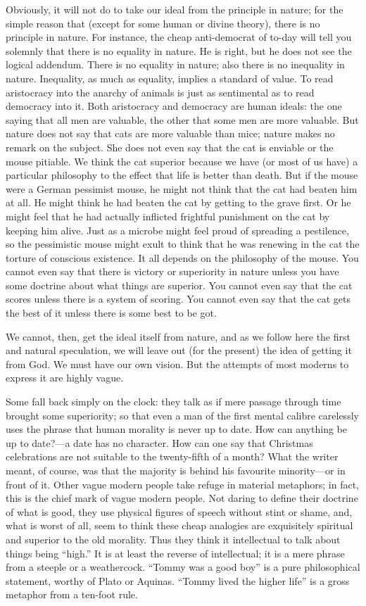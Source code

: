 Obviously, it will not do to take our ideal from the principle in nature; for the simple reason that (except for some human or divine theory), there is no principle in nature. For instance, the cheap anti-democrat of to-day will tell you solemnly that there is no equality in nature. He is right, but he does not see the logical addendum. There is no equality in nature; also there is no inequality in nature. Inequality, as much as equality, implies a standard of value. To read aristocracy into the anarchy of animals is just as sentimental as to read democracy into it. Both aristocracy and democracy are human ideals: the one saying that all men are valuable, the other that some men are more valuable. But nature does not say that cats are more valuable than mice; nature makes no remark on the subject. She does not even say that the cat is enviable or the mouse pitiable. We think the cat superior because we have (or most of us have) a particular philosophy to the effect that life is better than death. But if the mouse were a German pessimist mouse, he might not think that the cat had beaten him at all. He might think he had beaten the cat by getting to the grave first. Or he might feel that he had actually inflicted frightful punishment on the cat by keeping him alive. Just as a microbe might feel proud of spreading a pestilence, so the pessimistic mouse might exult to think that he was renewing in the cat the torture of conscious existence. It all depends on the philosophy of the mouse. You cannot even say that there is victory or superiority in nature unless you have some doctrine about what things are superior. You cannot even say that the cat scores unless there is a system of scoring. You cannot even say that the cat gets the best of it unless there is some best to be got.

We cannot, then, get the ideal itself from nature, and as we follow here the first and natural speculation, we will leave out (for the present) the idea of getting it from God. We must have our own vision. But the attempts of most moderns to express it are highly vague.

Some fall back simply on the clock: they talk as if mere passage through time brought some superiority; so that even a man of the first mental calibre carelessly uses the phrase that human morality is never up to date. How can anything be up to date?—a date has no character. How can one say that Christmas celebrations are not suitable to the twenty-fifth of a month? What the writer meant, of course, was that the majority is behind his favourite minority—or in front of it. Other vague modern people take refuge in material metaphors; in fact, this is the chief mark of vague modern people. Not daring to define their doctrine of what is good, they use physical figures of speech without stint or shame, and, what is worst of all, seem to think these cheap analogies are exquisitely spiritual and superior to the old morality. Thus they think it intellectual to talk about things being “high.” It is at least the reverse of intellectual; it is a mere phrase from a steeple or a weathercock. “Tommy was a good boy” is a pure philosophical statement, worthy of Plato or Aquinas. “Tommy lived the higher life” is a gross metaphor from a ten-foot rule.

